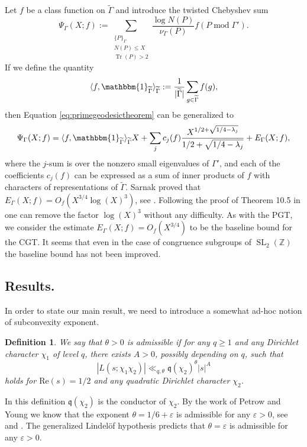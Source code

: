 \documentclass{article}
\newtheorem{defi}[thm]{Definition}
\theoremstyle{named}
\newcommand{\Z}{\mathbb{Z}}
\newcommand{\q}{\mathfrak{q}}
\newcommand{\N}{\mathcal{N}}
\DeclareMathOperator{\SL}{SL}
\DeclareMathOperator{\Tr}{Tr}
\DeclareMathOperator{\modulo}{mod}
\begin{document}
Let $f$ be a class function on $\widetilde{\Gamma}$ and introduce the twisted Chebyshev sum 
\begin{equation}\label{eq:twistedgeodesicsum}
    \Psi_{\Gamma}(X; f) := \sum_{\substack{\{P\}_{\Gamma}\\N(P)\leq X\\
    \Tr(P) > 2}}\frac{\log N(P)}{\nu_\Gamma(P)} f(P \modulo \Gamma').
\end{equation}
If we define the quantity
\begin{equation*}
    \langle f, \mathbbm{1}_{\widetilde{\Gamma}} \rangle_{\widetilde{\Gamma}} := \frac{1}{|\widetilde{\Gamma}|}\sum_{g \in \widetilde{\Gamma}} f(g),
\end{equation*}
then Equation \eqref{eq:primegeodesictheorem} can be generalized to 
\begin{equation}\label{eq:chebotarevgeodesictheorem}
    \Psi_{\Gamma}(X; f) = \langle f, \mathbbm{1}_{\widetilde{\Gamma}}\rangle_{\widetilde{\Gamma}} X+ \sum_j c_j(f) \frac{X^{1/2 + \sqrt{1/4 - \lambda_j}}}{1/2 + \sqrt{1/4 - \lambda_j}} + E_{\Gamma}(X; f),
\end{equation}
where the $j$-sum is over the nonzero small eigenvalues of $\Gamma'$, and each of the coefficients $c_j(f)$ can be expressed as a sum of inner products of $f$ with characters of representations of $\widetilde{\Gamma}$. Sarnak proved that $E_{\Gamma}(X; f) = O_f(X^{3/4}\log(X)^3)$, see \cite[Theorem 3.16]{sarnakthesis}. Following the proof of Theorem 10.5 in \cite{iwaniec} one can remove the factor $\log(X)^3$ without any difficulty. As with the PGT, we consider the estimate $E_\Gamma(X; f) = O_f(X^{3/4})$ to be the baseline bound for the CGT. It seems that even in the case of congruence subgroups of $\SL_2(\Z)$ the baseline bound has not been improved. 
\subsection{Results.}

In order to state our main result, we need to introduce a somewhat ad-hoc notion of subconvexity exponent.

\begin{defi}\label{defi:admissibleexponent}
We say that $\theta > 0$ is \emph{admissible} if for any $q \geq 1$ and any Dirichlet character $\chi_1$ of level $q$, there exists $A > 0$, possibly depending on $q$, such that 
\begin{equation*}
    |L(s; \chi_1 \chi_2)| \ll_{q, \theta} \q(\chi_2)^\theta |s|^A
\end{equation*}
holds for $\text{Re}(s) = 1/2$ and any quadratic Dirichlet character $\chi_2$.
\end{defi}
In this definition $\q(\chi_2)$ is the conductor of $\chi_2$. By the work of Petrow and Young we know that the exponent $\theta = 1/6 + \varepsilon$ is admissible for any $\varepsilon > 0$, see \cite{petrowyoung20} and \cite{petrowyoung}. The generalized Lindelöf hypothesis predicts that $\theta = \varepsilon$ is admissible for any $\varepsilon > 0$.  
\end{document}
